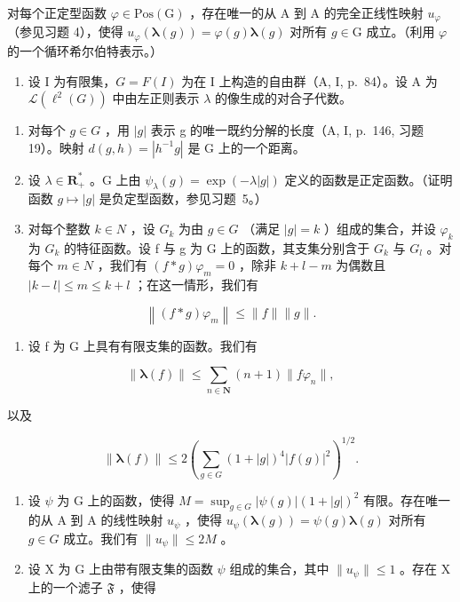 对每个正定型函数 \(\varphi\in\mathrm{Pos}(\mathrm{G})\) ，存在唯一的从 A 到 A 的完全正线性映射 \(u_{\varphi}\) （参见习题 4），使得 \(u_{\varphi}(\boldsymbol{\lambda}(g))=\varphi(g)\boldsymbol{\lambda}(g)\) 对所有 \(g\in\mathrm{G}\) 成立。（利用 \(\varphi\) 的一个循环希尔伯特表示。）

\begin{enumerate}
\def\labelenumi{\arabic{enumi})}
\setcounter{enumi}{6}
\tightlist
\item
  设 I 为有限集，\(G = F(I)\) 为在 I 上构造的自由群（A, I, p.~84）。设 A 为 \(\mathcal{L}(\ell^{2}(G))\) 中由左正则表示 \(\lambda\) 的像生成的对合子代数。
\end{enumerate}

\begin{enumerate}
\def\labelenumi{\alph{enumi})}
\item
  对每个 \(g \in G\) ，用 \(|g|\) 表示 g 的唯一既约分解的长度（A, I, p.~146, 习题 19）。映射 \(d(g, h) = |h^{-1}g|\) 是 G 上的一个距离。
\item
  设 \(\lambda \in \mathbf{R}_{+}^{*}\) 。G 上由 \(\psi_{\lambda}(g) = \exp(-\lambda|g|)\) 定义的函数是正定函数。（证明函数 \(g \mapsto |g|\) 是负定型函数，参见习题~5。）
\item
  对每个整数 \(k \in N\) ，设 \(G_{k}\) 为由 \(g \in G\) （满足 \(|g| = k\) ）组成的集合，并设 \(\varphi_{k}\) 为 \(G_{k}\) 的特征函数。设 f 与 g 为 G 上的函数，其支集分别含于 \(G_{k}\) 与 \(G_{l}\) 。对每个 \(m \in N\) ，我们有 \((f * g)\varphi_{m} = 0\) ，除非 \(k + l - m\) 为偶数且 \(|k - l| \leqslant m \leqslant k + l\) ；在这一情形，我们有
\end{enumerate}

\[
\left\| (f * g) \varphi_ {m} \right\| \leqslant \| f \| \| g \|.
\]

\begin{enumerate}
\def\labelenumi{\alph{enumi})}
\setcounter{enumi}{3}
\tightlist
\item
  设 f 为 G 上具有有限支集的函数。我们有
\end{enumerate}

\[
\| \boldsymbol {\lambda} (f) \| \leqslant \sum_ {n \in \mathbf {N}} (n + 1) \| f \varphi_ {n} \|,
\]

以及

\[
\left\| \boldsymbol {\lambda} (f) \right\| \leqslant 2 \left(\sum_ {g \in G} (1 + | g |) ^ {4} | f (g) | ^ {2}\right) ^ {1 / 2}.
\]

\begin{enumerate}
\def\labelenumi{\alph{enumi})}
\setcounter{enumi}{4}
\item
  设 \(\psi\) 为 G 上的函数，使得 \(M = \sup_{g \in G} |\psi(g)| (1 + |g|)^2\) 有限。存在唯一的从 A 到 A 的线性映射 \(u_\psi\) ，使得 \(u_\psi(\boldsymbol{\lambda}(g)) = \psi(g)\boldsymbol{\lambda}(g)\) 对所有 \(g \in G\) 成立。我们有 \(\|u_\psi\| \leqslant 2M\) 。
\item
  设 X 为 G 上由带有限支集的函数 \(\psi\) 组成的集合，其中 \(\|u_{\psi}\|\leqslant1\) 。存在 X 上的一个滤子 \(\mathfrak{F}\) ，使得
\end{enumerate}

